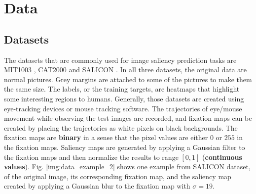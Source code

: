 \documentclass[12pt]{article}
\begin{document}
\section{Data}
\subsection{Datasets}
\label{sec:datasets}
The datasets that are commonly used for image saliency prediction tasks are MIT1003 \cite{judd2012benchmark}, CAT2000 \cite{borji2015cat2000} and SALICON \cite{jiang2015salicon}.
In all three datasets, the original data are normal pictures. Grey margins are attached to some of the pictures to make them the same size. 
The labels, or the training targets, are heatmaps that highlight some interesting regions to humans.
Generally, those datasets are created using eye-tracking devices or mouse tracking software. The trajectories of eye/mouse movement while
observing the test images are recorded, and fixation maps can be created
by placing the trajectories as white pixels on black backgrounds. The fixation maps are \textbf{binary} in a sense that
the pixel values are either $0$ or $255$ in the fixation maps.
Saliency maps are generated by applying a Gaussian filter to the fixation maps and then normalize the results to range $[0, 1]$ (\textbf{continuous values}).
Fig. \ref{img:data_example_2} shows one example from SALICON dataset, of the original image, its corresponding
fixation map, and the saliency map created by applying a Gaussian blur to the fixation map with $\sigma=19$.
\end{document}
